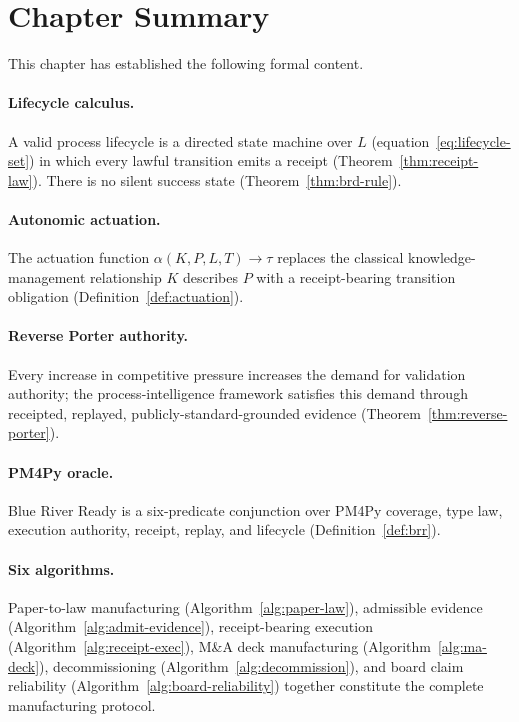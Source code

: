 \section{Chapter Summary}
\label{sec:pi-summary}

This chapter has established the following formal content.

\paragraph{Lifecycle calculus.} A valid process lifecycle is a directed state
machine over $L$ (equation~\ref{eq:lifecycle-set}) in which every lawful
transition emits a receipt (Theorem~\ref{thm:receipt-law}). There is no silent
success state (Theorem~\ref{thm:brd-rule}).

\paragraph{Autonomic actuation.} The actuation function $\alpha(K,P,L,T) \to
\tau$ replaces the classical knowledge-management relationship $K$ describes
$P$ with a receipt-bearing transition obligation (Definition~\ref{def:actuation}).

\paragraph{Reverse Porter authority.} Every increase in competitive pressure
increases the demand for validation authority; the process-intelligence
framework satisfies this demand through receipted, replayed,
publicly-standard-grounded evidence (Theorem~\ref{thm:reverse-porter}).

\paragraph{PM4Py oracle.} Blue River Ready is a six-predicate conjunction
over PM4Py coverage, type law, execution authority, receipt, replay, and
lifecycle (Definition~\ref{def:brr}).

\paragraph{Six algorithms.} Paper-to-law manufacturing
(Algorithm~\ref{alg:paper-law}), admissible evidence
(Algorithm~\ref{alg:admit-evidence}), receipt-bearing execution
(Algorithm~\ref{alg:receipt-exec}), M\&A deck manufacturing
(Algorithm~\ref{alg:ma-deck}), decommissioning
(Algorithm~\ref{alg:decommission}), and board claim reliability
(Algorithm~\ref{alg:board-reliability}) together constitute the complete
manufacturing protocol.


